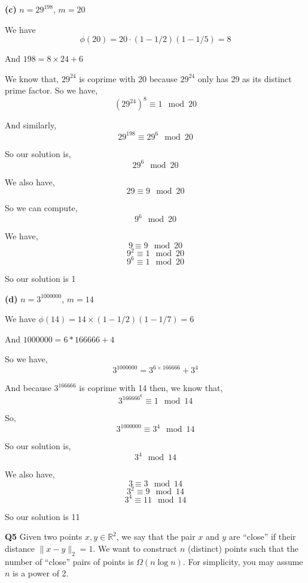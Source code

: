 \documentclass[12pt]{article}
\newcommand{\question}[3][Q]{
\begin{description}
\item \textbf{#1{#2}} #3
\end{description}
}
\newcommand{\R}{\mathbb{R}}
\begin{document}
\question[]{(c)}{
    $n = 29^{198}$, $m = 20$
}
\begin{answer}
    We have $$\phi(20) = 20 \cdot (1 - 1 /2) (1 - 1 /5) = 8 $$

    And $198 = 8 \times 24 + 6 $

    We know that, $ 29^{24} $ is coprime with 20 because $29^{24}$ only has 29 as its distinct prime factor. So we have, 
    $$ (29^{24})^{8} \equiv 1 \mod 20 $$ 


    And similarly, 
    $$ 29^{198} \equiv 29^{6} \mod 20 $$ 

    So our solution is, 
    $$ 29^{6} \mod 20 $$ 

    We also have, 
    $$ 29 \equiv 9 \mod 20 $$ 

    So we can compute, 
    $$ 9^{6} \mod 20 $$ 

    We have, 
    $$ 9 \equiv 9 \mod 20 $$ 
    $$ 9^2 \equiv 1  \mod 20 $$ 
    $$ 9^{6} \equiv  1 \mod 20 $$ 


    So our solution is 1

\end{answer}

\question[]{(d)}{
    $n = 3^{1000000}$, $m = 14$
}
\begin{answer}
    We have $\phi(14) = 14 \times  (1 - 1 /2) (1 - 1 /7) = 6$

    And $1000000 = 6 * 166666 + 4$

    So we have,  
    $$ 3^{1000000} = 3^{6 \times 166666} + 3^{4} $$ 

    And because $3^{166666}$ is coprime with 14 then, we know that, 
    $$ 3^{166666}^{6} \equiv 1 \mod 14 $$  

    So, 
    $$ 3^{1000000} \equiv 3^{4} \mod 14 $$  


    So our solution is, 
    $$ 3^{4} \mod 14 $$ 
    
    We also have, 
    $$ 3 \equiv 3 \mod 14 $$ 
    $$ 3^2 \equiv 9 \mod 14 $$ 
    $$ 3^{4} \equiv 11 \mod 14 $$ 

    So our solution is 11
\end{answer}

\newpage 

\question{5}{
    Given two points $x, y \in \R^2$, we say that the pair $x$ and $y$ are ``close'' if their distance $\|x - y\|_2 = 1$. We want to construct $n$ (distinct) points such that the number of ``close'' pairs of points is $\Omega(n\log n)$. For simplicity, you may assume $n$ is a power of 2. 
}
\end{document}
